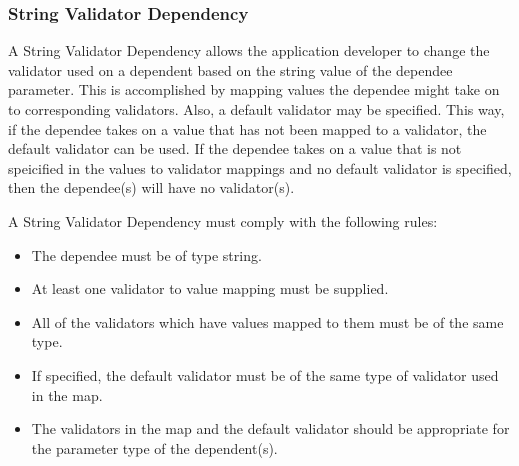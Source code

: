 \subsubsection{String Validator Dependency}
A String Validator Dependency allows the application developer to change the validator used on a dependent based on the string value of the dependee
parameter. This is accomplished by mapping values the dependee might take on to corresponding validators. Also, a default validator may be specified.
This way, if the dependee takes on a value that has not been mapped to a validator, the default validator can be used. If the dependee takes on a value
that is not speicified in the values to validator mappings and no default validator is specified, then the dependee(s) will have no validator(s).

A String Validator Dependency must comply with the following rules:
\begin{itemize}
\item The dependee must be of type string.
\item At least one validator to value mapping must be supplied.
\item All of the validators which have values mapped to them must be of the same type.
\item If specified, the default validator must be of the same type of validator used in the map.
\item The validators in the map and the default validator should be appropriate for the parameter type of the dependent(s).
\end{itemize}

